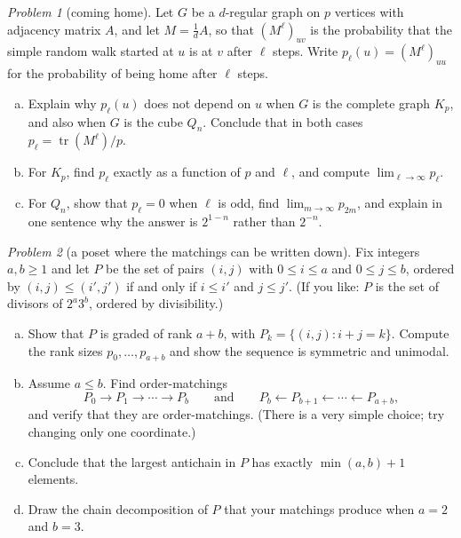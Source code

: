 \documentclass[11pt,twoside]{amsart}
\theoremstyle{plain}
\theoremstyle{remark}
\newtheorem{prob}{Problem}
\theoremstyle{definition}
\newcommand{\tr}{\operatorname{tr}}
\begin{document}
\begin{prob}[coming home]
Let $G$ be a $d$-regular graph on $p$ vertices with adjacency matrix $A$, and let $M=\tfrac1dA$,
so that $(M^{\ell})_{uv}$ is the probability that the simple random walk started at $u$ is at
$v$ after $\ell$ steps. Write $p_\ell(u)=(M^{\ell})_{uu}$ for the probability of being home after
$\ell$ steps.
\begin{enumerate}[(a)]
\item Explain why $p_\ell(u)$ does not depend on $u$ when $G$ is the complete graph $K_p$, and
also when $G$ is the cube $Q_n$. Conclude that in both cases $p_\ell=\tr(M^{\ell})/p$.
\item For $K_p$, find $p_\ell$ exactly as a function of $p$ and $\ell$, and compute
$\lim_{\ell\to\infty}p_\ell$.
\item For $Q_n$, show that $p_\ell=0$ when $\ell$ is odd, find $\lim_{m\to\infty}p_{2m}$, and
explain in one sentence why the answer is $2^{1-n}$ rather than $2^{-n}$.
\end{enumerate}
\end{prob}

\begin{prob}[a poset where the matchings can be written down]
Fix integers $a,b\ge1$ and let $P$ be the set of pairs $(i,j)$ with $0\le i\le a$ and
$0\le j\le b$, ordered by $(i,j)\le(i',j')$ if and only if $i\le i'$ and $j\le j'$. (If you like:
$P$ is the set of divisors of $2^a3^b$, ordered by divisibility.)
\begin{enumerate}[(a)]
\item Show that $P$ is graded of rank $a+b$, with $P_k=\{(i,j):i+j=k\}$. Compute the rank sizes
$p_0,\dots,p_{a+b}$ and show the sequence is symmetric and unimodal.
\item Assume $a\le b$. Find order-matchings
\[
P_0\to P_1\to\cdots\to P_b \qquad\text{and}\qquad P_b\leftarrow P_{b+1}\leftarrow\cdots\leftarrow P_{a+b},
\]
and verify that they are order-matchings. (There is a very simple choice; try changing only one
coordinate.)
\item Conclude that the largest antichain in $P$ has exactly $\min(a,b)+1$ elements.
\item Draw the chain decomposition of $P$ that your matchings produce when $a=2$ and $b=3$.
\end{enumerate}
\end{prob}
\end{document}

